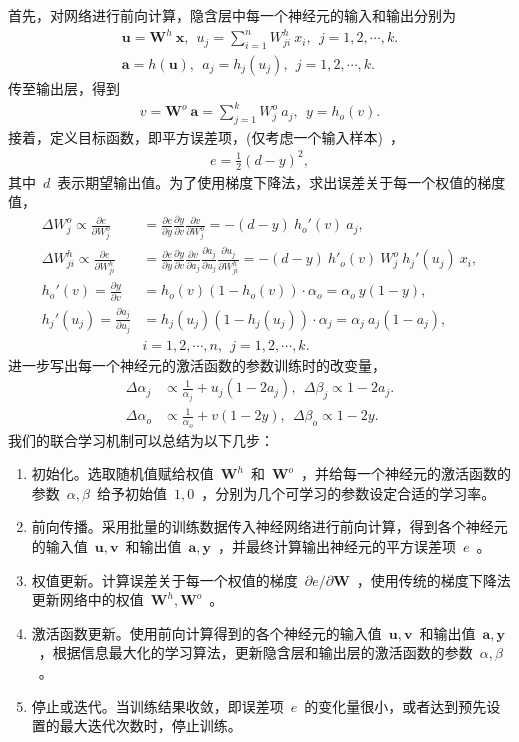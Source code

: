 \documentclass[UTF8,a4paper,12pt]{ctexart}
\numberwithin{equation}{section}
\numberwithin{figure}{section}
\numberwithin{table}{section}
\begin{document}
首先，对网络进行前向计算，隐含层中每一个神经元的输入和输出分别为
\begin{align}
\bm{u} = \bm{W}^h ~ \bm{x},~~u_j = \sum_{i=1}^{n} W_{ji}^h ~ x_i,~~j=1,2,\cdots,k.\\
\bm{a} = h(\bm{u}),~~a_j = h_j(u_j),~~j=1,2,\cdots,k.
\end{align}
传至输出层，得到
\begin{align}
v = \bm{W}^o ~ \bm{a} = \sum_{j=1}^{k} W_j^o ~ a_j,~~y = h_o(v).
\end{align}
接着，定义目标函数，即平方误差项，(仅考虑一个输入样本)~，
\begin{align}
e = \frac{1}{2} (d- y)^2,
\end{align}
其中~$d$~表示期望输出值。为了使用梯度下降法，求出误差关于每一个权值的梯度值，
\begin{align}
\Delta W_j^o \varpropto  \frac{\partial e}{\partial W_j^o} &= \frac{\partial e}{\partial y} \frac{\partial y}{\partial v}\frac{\partial v}{\partial W_j^o} = -(d-y)~h_o'(v)~a_j,\\
\Delta W_{ji}^h \varpropto \frac{\partial e}{\partial W_{ji}^h} &= \frac{\partial e}{\partial y}\frac{\partial y}{\partial v}\frac{\partial v}{\partial a_j}\frac{\partial a_j}{\partial u_j}\frac{\partial u_j}{\partial W_{ji}^h} = -(d-y)~h'_o(v)~W_j^o~h_j'(u_j)~x_i,\\
h_o'(v) = \frac{\partial y}{\partial v} &= h_o(v)(1 - h_o(v)) \cdot \alpha_o = \alpha_o ~ y (1 - y), \\
h_j'(u_j) = \frac{\partial a_j}{\partial u_j} &= h_j(u_j)(1 - h_j(u_j)) \cdot \alpha_j = \alpha_j ~ a_j (1 - a_j), \\
&i=1,2,\cdots,n,~~j=1,2,\cdots,k. \nonumber
\end{align}
进一步写出每一个神经元的激活函数的参数训练时的改变量，
\begin{align}
\Delta \alpha_j & \varpropto \frac{1}{\alpha_j} + u_j (1 - 2 a_j),~~\Delta \beta_j \varpropto 1 - 2 a_j. \\
\Delta \alpha_o & \varpropto \frac{1}{\alpha_o} + v (1 - 2 y),~~\Delta \beta_o \varpropto 1 - 2 y.
\end{align}
我们的联合学习机制可以总结为以下几步：
\begin{enumerate}
	\item 初始化。选取随机值赋给权值~$\bm{W}^h$~和~$\bm{W}^o$~，并给每一个神经元的激活函数的参数~$\alpha,\beta$~给予初始值~$1,0$~，分别为几个可学习的参数设定合适的学习率。
	\item 前向传播。采用批量的训练数据传入神经网络进行前向计算，得到各个神经元的输入值~$\bm{u},\bm{v}$~和输出值~$\bm{a},\bm{y}$~，并最终计算输出神经元的平方误差项~$e$~。
	\item 权值更新。计算误差关于每一个权值的梯度~$\partial e / \partial \bm{W}$~，使用传统的梯度下降法更新网络中的权值~$\bm{W}^h,\bm{W}^o$~。
	\item 激活函数更新。使用前向计算得到的各个神经元的输入值~$\bm{u},\bm{v}$~和输出值~$\bm{a},\bm{y}$~，根据信息最大化的学习算法，更新隐含层和输出层的激活函数的参数~$\alpha,\beta$~。
	\item 停止或迭代。当训练结果收敛，即误差项~$e$~的变化量很小，或者达到预先设置的最大迭代次数时，停止训练。
\end{enumerate}
\end{document}
